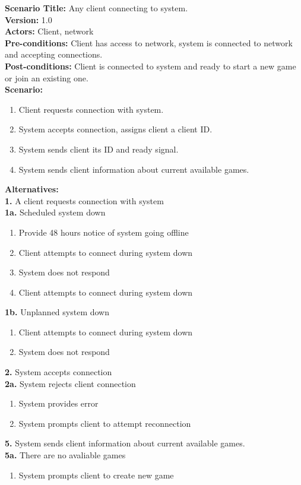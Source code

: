 \documentclass[letterpaper,12pt]{article}
\begin{document}
\noindent \textbf{Scenario Title:} Any client connecting to system.\\
\textbf{Version:} 1.0\\
\textbf{Actors:} Client, network\\
\textbf{Pre-conditions:} Client has access to network, system is connected to network and accepting connections.\\
\textbf{Post-conditions:} Client is connected to system and ready to start a new game or join an existing one.\\
\textbf{Scenario:}
\begin{enumerate}
   \item Client requests connection with system.
   \item System accepts connection, assigns client a client ID.
   \item System sends client its ID and ready signal.
   \item System sends client information about current available games.
\end{enumerate}
\textbf{Alternatives:}\\
\textbf{1.} A client requests connection with system\\
\textbf{1a.} Scheduled system down
\begin{enumerate}
\item Provide 48 hours notice of system going offline
\item Client attempts to connect during system down
\item System does not respond
\item Client attempts to connect during system down
\end{enumerate}
\textbf{1b.} Unplanned system down
\begin{enumerate}
\item Client attempts to connect during system down
\item System does not respond
\end{enumerate}
\textbf{2.} System accepts connection\\
\textbf{2a.} System rejects client connection
\begin{enumerate}
\item System provides error
\item System prompts client to attempt reconnection
\end{enumerate}
\textbf{5.} System sends client information about current available games.\\
\textbf{5a.} There are no avaliable games
\begin{enumerate}
\item System prompts client to create new game
\end{enumerate}
\end{document}
